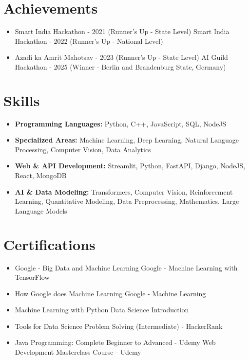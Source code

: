 \documentclass[a4paper,10pt]{article}
\begin{document}
\section*{Achievements}
\begin{itemize}
\item Smart India Hackathon - 2021 (Runner's Up - State Level) \hfill Smart India Hackathon - 2022 (Runner's Up - National Level)
\item Azadi ka Amrit Mahotsav - 2023 (Runner's Up - State Level) \hfill AI Guild Hackathon - 2025 (Winner - Berlin and Brandenburg State, Germany)
\end{itemize}

\section*{Skills}
\begin{itemize}
  \item \textbf{Programming Languages:} Python, C++, JavaScript, SQL, NodeJS
  \item \textbf{Specialized Areas:} Machine Learning, Deep Learning, Natural Language Processing, Computer Vision, Data Analytics
  \item \textbf{Web \& API Development:} Streamlit, Python, FastAPI, Django, NodeJS, React, MongoDB
  \item \textbf{AI \& Data Modeling:} Transformers, Computer Vision, Reinforcement Learning, Quantitative Modeling, Data Preprocessing, Mathematics, Large Language Models
\end{itemize}

\section*{Certifications}
\begin{itemize}
\item Google - Big Data and Machine Learning \hfill Google - Machine Learning with TensorFlow
\item How Google does Machine Learning \hfill Google - Machine Learning
\item Machine Learning with Python \hfill Data Science Introduction
\item Tools for Data Science \hfill Problem Solving (Intermediate) - HackerRank
\item Java Programming: Complete Beginner to Advanced - Udemy \hfill Web Development Masterclass Course - Udemy
\end{itemize}
\end{document}
